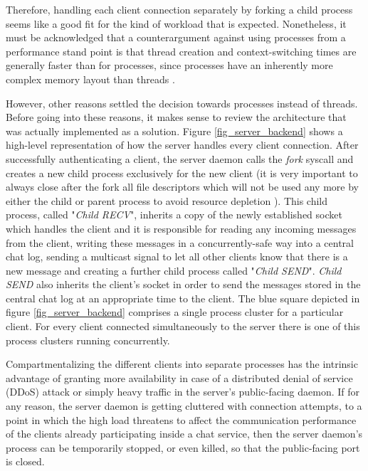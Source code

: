 Therefore, handling each client connection separately by forking a child process seems like a good fit for the kind of workload that is expected. Nonetheless, it must be acknowledged that a counterargument against using processes from a performance stand point is that thread creation and context-switching times are generally faster than for processes, since processes have an inherently more complex memory layout than threads \cite{Kerrisk2010}.

However, other reasons settled the decision towards processes instead of threads. Before going into these reasons, it makes sense to review the architecture that was actually implemented as a solution. Figure \ref{fig_server_backend} shows a high-level representation of how the server handles every client connection. After successfully authenticating a client, the server daemon calls the \textit{fork} syscall and creates a new child process exclusively for the new client (it is very important to always close after the fork all file descriptors which will not be used any more by either the child or parent process to avoid resource depletion \cite{Kerrisk2010}). This child process, called "\textit{Child RECV}", inherits a copy of the newly established socket which handles the client and it is responsible for reading any incoming messages from the client, writing these messages in a concurrently-safe way into a central chat log, sending a multicast signal to let all other clients know that there is a new message and creating a further child process called "\textit{Child SEND}". \textit{Child SEND} also inherits the client's socket in order to send the messages stored in the central chat log at an appropriate time to the client. The blue square depicted in figure \ref{fig_server_backend} comprises a single process cluster for a particular client. For every client connected simultaneously to the server there is one of this process clusters running concurrently.

 Compartmentalizing the different clients into separate processes has the intrinsic advantage of granting more availability in case of a distributed denial of service (DDoS) attack or simply heavy traffic in the server's public-facing daemon. If for any reason, the server daemon is getting cluttered with connection attempts, to a point in which the high load threatens to affect the communication performance of the clients already participating inside a chat service, then the server daemon's process can be temporarily stopped, or even killed, so that the public-facing port is closed. 



